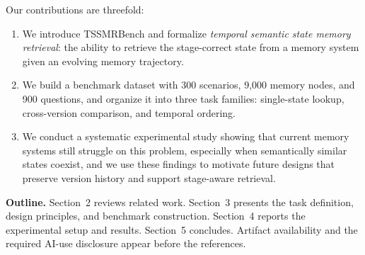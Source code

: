 Our contributions are threefold:
\begin{enumerate}[leftmargin=*,topsep=2pt,itemsep=1pt]
\item We introduce TSSMRBench and formalize \emph{temporal semantic state memory retrieval}: the ability to retrieve the stage-correct state from a memory system given an evolving memory trajectory.
\item We build a benchmark dataset with 300 scenarios, 9{,}000 memory nodes, and 900 questions, and organize it into three task families: single-state lookup, cross-version comparison, and temporal ordering.
\item We conduct a systematic experimental study showing that current memory systems still struggle on this problem, especially when semantically similar states coexist, and we use these findings to motivate future designs that preserve version history and support stage-aware retrieval.
\end{enumerate}

\textbf{Outline.} Section~2 reviews related work. Section~3 presents the task definition, design principles, and benchmark construction. Section~4 reports the experimental setup and results. Section~5 concludes. Artifact availability and the required AI-use disclosure appear before the references.
